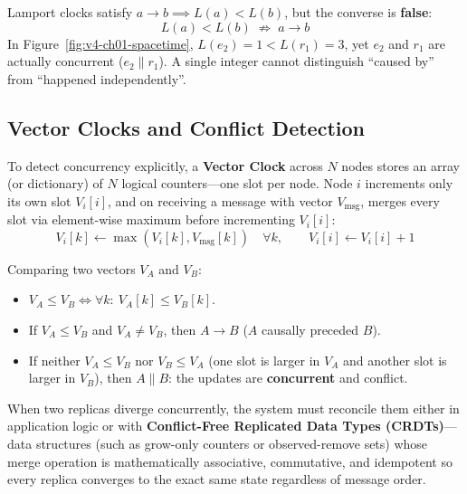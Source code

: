 \begin{commonmistakebox}
Lamport clocks satisfy $a \to b \implies L(a) < L(b)$, but the converse is \textbf{false}:
\begin{equation}
L(a) < L(b) \;\not\Longrightarrow\; a \to b
\end{equation}
In Figure~\ref{fig:v4-ch01-spacetime}, $L(e_2) = 1 < L(r_1) = 3$, yet $e_2$ and $r_1$ are actually concurrent ($e_2 \parallel r_1$). A single integer cannot distinguish ``caused by'' from ``happened independently''.
\end{commonmistakebox}

\subsection{Vector Clocks and Conflict Detection}

To detect concurrency explicitly, a \textbf{Vector Clock} across $N$ nodes stores an array (or dictionary) of $N$ logical counters---one slot per node. Node $i$ increments only its own slot $V_i[i]$, and on receiving a message with vector $V_{\text{msg}}$, merges every slot via element-wise maximum before incrementing $V_i[i]$:
\begin{equation}
V_i[k] \leftarrow \max(V_i[k], V_{\text{msg}}[k]) \quad \forall k, \qquad V_i[i] \leftarrow V_i[i] + 1
\end{equation}

Comparing two vectors $V_A$ and $V_B$:
\begin{itemize}[leftmargin=18pt]
  \item $V_A \le V_B \iff \forall k:\ V_A[k] \le V_B[k]$.
  \item If $V_A \le V_B$ and $V_A \neq V_B$, then $A \to B$ ($A$ causally preceded $B$).
  \item If neither $V_A \le V_B$ nor $V_B \le V_A$ (one slot is larger in $V_A$ and another slot is larger in $V_B$), then $A \parallel B$: the updates are \textbf{concurrent} and conflict.
\end{itemize}

When two replicas diverge concurrently, the system must reconcile them either in application logic or with \textbf{Conflict-Free Replicated Data Types (CRDTs)}---data structures (such as grow-only counters or observed-remove sets) whose merge operation is mathematically associative, commutative, and idempotent so every replica converges to the exact same state regardless of message order.

